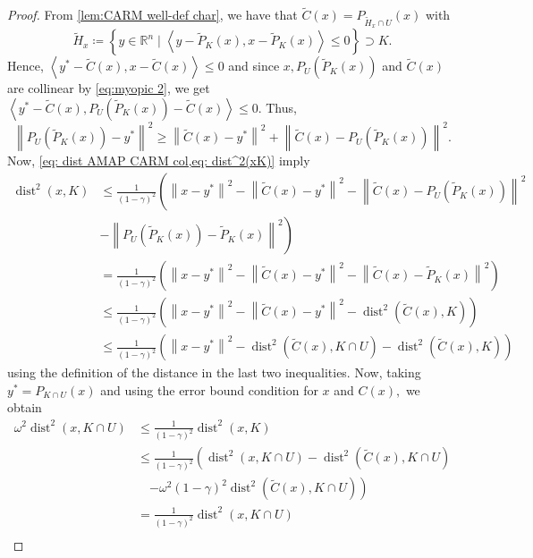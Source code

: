 \documentclass[smallextended,numbook,nospthms]{svjour3}
\theoremstyle{plain}
\theoremstyle{definition}
\def\RR{\mathds R}
\DeclareMathOperator{\dist}{dist}
\begin{document}
\begin{proof}
	From \cref{lem:CARM well-def char}, we have that $\tilde{C}(x)=P_{\tilde{H}_{x} \cap U}(x)$ with
	\[
	\tilde{H}_{x}\coloneqq \left\{y \in \RR^{n} \mid\left\langle y-\tilde{P}_{K}(x), x-\tilde{P}_{K}(x)\right\rangle \leq 0\right\} \supset K.
	\]
	Hence,
	$\left\langle y^{*}-\tilde{C}(x), x-\tilde{C}(x)\right\rangle \leq 0$ and since $x, P_{U}\left(\tilde{P}_{K}(x)\right)$ and $\tilde{C}(x)$ are collinear by \cref{eq:myopic 2}, we get $\left\langle y^{*}-\tilde{C}(x), P_{U}\left(\tilde{P}_{K}(x)\right)-\tilde{C}(x)\right\rangle \leq 0$. Thus,
	\begin{equation}\label{eq: dist AMAP CARM col}
		\left\|P_{U}\left(\tilde{P}_{K}(x)\right)-y^{*}\right\|^{2} \geq\left\|\tilde{C}(x)-y^{*}\right\|^{2}+\left\|\tilde{C}(x)-P_{U}\left(\tilde{P}_{K}(x)\right)\right\|^{2}.
	\end{equation}
	Now, \cref{eq: dist AMAP CARM col,eq: dist^2(xK)} imply
	\begin{align}
		\dist^{2}(x, K) & \leq\frac{1}{(1-\gamma)^2}\left(\left\|x-y^{*}\right\|^{2}-\left\|\tilde{C}(x)-y^{*}\right\|^{2}-\left\|\tilde{C}(x)-P_{U}\left(\tilde{P}_{K}(x)\right)\right\|^{2}\right. \\
		&\left.-\left\|P_{U}\left(\tilde{P}_{K}(x)\right)-\tilde{P}_{K}(x)\right\|^{2}\right) \\
		&=\frac{1}{(1-\gamma)^2}\left(\left\|x-y^{*}\right\|^{2}-\left\|\tilde{C}(x)-y^{*}\right\|^{2}-\left\|\tilde{C}(x)-\tilde{P}_{K}(x)\right\|^{2}\right) \\
		& \leq\frac{1}{(1-\gamma)^2}\left(\left\|x-y^{*}\right\|^{2}-\left\|\tilde{C}(x)-y^{*}\right\|^{2}-\dist^{2}(\tilde{C}(x), K)\right) \\
		& \leq\frac{1}{(1-\gamma)^2}\left(\left\|x-y^{*}\right\|^{2}-\dist^{2}(\tilde{C}(x), K \cap U)-\dist^{2}(\tilde{C}(x), K)\right)
	\end{align}
	using the definition of the distance in the last two inequalities. Now, taking $y^{*}=P_{K \cap U}(x)$ and using the error bound condition for $x$ and $C(x),$ we obtain
	\begin{align}
		\omega^{2}\dist^{2}(x, K \cap U) &\leq \frac{1}{(1-\gamma)^2}\dist^{2}(x, K) \\
		&\leq \frac{1}{(1-\gamma)^2}\left(\dist^{2}(x, K \cap U)-\dist^{2}(\tilde{C}(x), K \cap U)\right.\\
		&\quad\left.- \omega^{2}(1-\gamma)^{2} \dist^{2}(\tilde{C}(x), K \cap U)\right)  \\
		&=\frac{1}{(1-\gamma)^2}\dist^{2}(x, K \cap U)\\

\end{align}
\end{proof}
\end{document}
